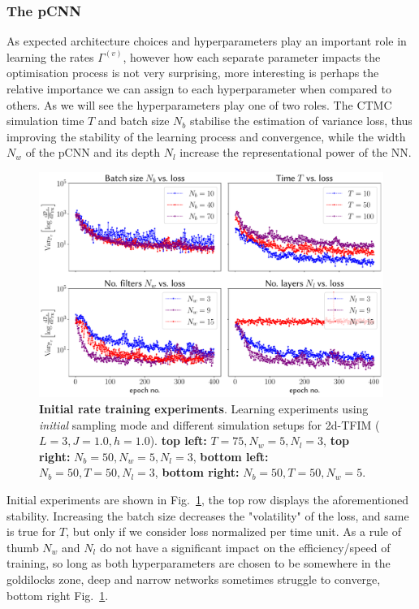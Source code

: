 \subsubsection{The pCNN}
As expected architecture choices and hyperparameters play an important role in learning the rates $\Gamma^{(v)}$, however how each separate parameter impacts the optimisation process is not very surprising, more interesting is perhaps the relative importance we can assign to each hyperparameter when compared to others. As we will see the hyperparameters play one of two roles. The CTMC simulation time $T$ and batch size $N_b$ stabilise the estimation of variance loss, thus improving the stability of the learning process and convergence, while the width $N_w$ of the pCNN and its depth $N_l$ increase the representational power of the NN.
\begin{figure}[H]
	\centering
	\includegraphics[width=\linewidth]{Chapter5/Figs/Vector/init_test_learning}
	\caption[Initial rate training experiments]{\textbf{Initial rate training experiments}. Learning experiments using \emph{initial} sampling mode and different simulation setups for 2d-TFIM ($L=3, J=1.0, h=1.0$). \textbf{top left:} $T = 75, N_w = 5, N_l = 3$, \textbf{top right:} $N_b = 50, N_w = 5, N_l = 3$, \textbf{bottom left:} $N_b = 50, T = 50, N_l = 3$, \textbf{bottom right:} $N_b = 50, T = 50, N_w = 5$.}
	\label{fig:inittestlearning}
\end{figure}
Initial experiments are shown in Fig.~\ref{fig:inittestlearning}, the top row displays the aforementioned stability. Increasing the batch size decreases the "volatility" of the loss, and same is true for $T$, but only if we consider loss normalized per time unit. As a rule of thumb $N_w$ and $N_l$ do not have a significant impact on the efficiency/speed of training, so long as both hyperparameters are chosen to be somewhere in the goldilocks zone, deep and narrow networks sometimes struggle to converge, bottom right Fig.~\ref{fig:inittestlearning}.

